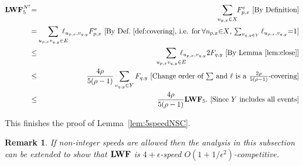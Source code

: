 \documentclass[11pt]{article}
\newtheorem{remark}[lemma]{Remark}
\newcommand{\eps}{\epsilon}
\newcommand{\len}{\mathfrak{\rho}}
\newcommand{\fe}{F^e}
\newcommand{\lwfne}{\lwf^{N^e}}
\begin{document}
\begin{titlepage}
\begin{eqnarray*}
\lwfne_{5}\hspace{-1mm}
&=& \hspace{-0.6mm}\sum_{u_{p,x} \in X} \hspace{-1mm}\fe_{p,x} \mbox{ [By Definition]} \\
&=& \hspace{-2.8mm} \sum_{u_{p,x}v_{q,y} \in E} \hspace{-3.5mm} \ell_{u_{p,x},v_{q,y}} \fe_{p,x}  \mbox{ [By Def.~\ref{def:covering}, i.e. for \hspace{-0.5mm}$\forall u_{p,x} \hspace{-1mm}\in \hspace{-1mm}X$, $\sum_{v_{q,y \in Y}} \ell_{u_{p,x},v_{q,y}}\hspace{-0.9mm} = \hspace{-0.9mm}1$]}  \\
&\leq&  \hspace{-2.8mm} \sum_{u_{p,x}v_{q,y} \in E} \hspace{-3.5mm}\ell_{u_{p,x},v_{q,y}} 2 F_{q, y} \mbox{ [By Lemma~\ref{lem:close}]} \\
&\leq& \frac{4 \len}{5(\len-1)} \sum_{v_{q,y} \in Y} F_{q, y} \mbox{ [Change order of $\sum$ and $\ell$ is a $\frac{2
\len}{5(\len-1)}$-covering]} \\ \vspace{-1.5mm}
&\leq& \frac{4 \len}{5(\len-1)} \lwf_{5}. \mbox{ [Since $Y$ includes all events]} \\
\end{eqnarray*}

This finishes the proof of Lemma~\ref{lem:5speedNSC}.


\begin{remark}
  If non-integer speeds are allowed then the analysis in this
  subsection can be extended to show that ${\texttt{\bf{LWF}}}$ is ${4+ \eps}$-speed
  $O(1+1/\eps^2)$-competitive.
\vspace{-2.5mm}
\end{remark}


\end{titlepage}
\end{document}
